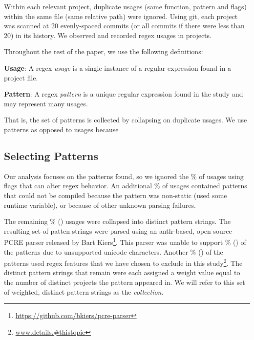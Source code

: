 Within each relevant project, duplicate usages (same function, pattern and flags) within the same file (same relative path) were ignored.  Using git, each project was scanned at 20 evenly-spaced commits (or all commits if there were less than 20) in its history.  We observed and recorded  regex usages in  projects.

Throughout the rest of the paper, we use the following definitions:

\noindent \textbf{Usage}: A regex \emph{usage} is a single instance of a regular expression found in a project file. 

\noindent \textbf{Pattern}: A regex \emph{pattern} is a unique regular expression found in the study and may represent many usages. 

That is, the set of patterns is collected by collapsing on duplicate usages. We use patterns as opposed to usages because 


\subsection{Selecting Patterns}
Our analysis focuses on the patterns found, so we ignored the \%  of usages using flags that can alter regex behavior.  An additional \% of usages contained patterns that could not be compiled because the pattern was non-static (used some runtime variable), or because of other unknown parsing failures.

The remaining \% () usages were collapsed into  distinct pattern strings.  The resulting set of patten strings were parsed using an antlr-based, open source PCRE parser released by Bart Kiers\footnote{\url{https://github.com/bkiers/pcre-parser}}.  This parser was unable to support \% () of the patterns due to unsupported unicode characters.  Another \% () of the patterns used regex features that we have chosen to exclude in this study\footnote{\url{www.details.#thistopic}}.  The  distinct pattern strings that remain were each assigned a weight value equal to the number of distinct projects the pattern appeared in.  We will refer to this set of weighted, distinct pattern strings as the \emph{collection}.


